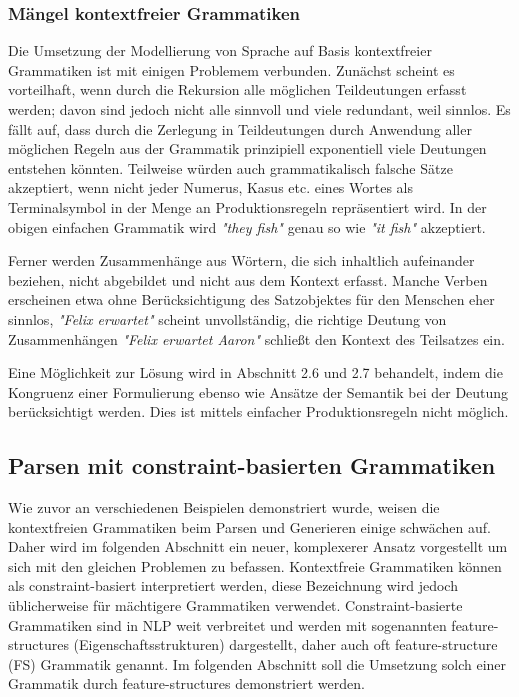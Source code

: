 \documentclass[12pt]{paper}
\begin{document}
\subsubsection{Mängel kontextfreier Grammatiken}
Die Umsetzung der Modellierung von Sprache auf Basis kontextfreier Grammatiken ist mit einigen Problemem verbunden. Zunächst scheint es vorteilhaft, wenn durch die Rekursion alle möglichen Teildeutungen erfasst werden; davon sind jedoch nicht alle sinnvoll und viele redundant, weil sinnlos. Es fällt auf, dass durch die Zerlegung in Teildeutungen durch Anwendung aller möglichen Regeln aus der Grammatik prinzipiell exponentiell viele Deutungen entstehen könnten. Teilweise würden auch grammatikalisch falsche Sätze akzeptiert, wenn nicht jeder Numerus, Kasus etc. eines Wortes als Terminalsymbol in der Menge an Produktionsregeln repräsentiert wird. In der obigen einfachen Grammatik wird \textit{"they fish"} genau so wie \textit{"it fish"} akzeptiert. 

Ferner werden Zusammenhänge aus Wörtern, die sich inhaltlich aufeinander beziehen, nicht abgebildet und nicht aus dem Kontext erfasst. Manche Verben erscheinen etwa ohne Berücksichtigung des Satzobjektes für den Menschen eher sinnlos, \textit{"Felix erwartet"} scheint unvollständig, die richtige Deutung von Zusammenhängen \textit{"Felix erwartet Aaron"} schließt den Kontext des Teilsatzes ein.

Eine Möglichkeit zur Lösung wird in Abschnitt 2.6 und 2.7 behandelt, indem die Kongruenz einer Formulierung ebenso wie Ansätze der Semantik bei der Deutung berücksichtigt werden. Dies ist mittels einfacher Produktionsregeln nicht möglich.

\subsection{Parsen mit constraint-basierten Grammatiken}
Wie zuvor an verschiedenen Beispielen demonstriert wurde, weisen die kontextfreien Grammatiken beim Parsen und Generieren einige schwächen auf. Daher wird im folgenden Abschnitt ein neuer, komplexerer Ansatz vorgestellt um sich mit den gleichen Problemen zu befassen. Kontextfreie Grammatiken können als constraint-basiert interpretiert werden, diese Bezeichnung wird jedoch üblicherweise für mächtigere Grammatiken verwendet. Constraint-basierte Grammatiken sind in NLP weit verbreitet und werden mit sogenannten feature-structures (Eigenschaftsstrukturen) dargestellt, daher auch oft feature-structure (FS) Grammatik genannt. Im folgenden Abschnitt soll die Umsetzung solch einer Grammatik durch feature-structures demonstriert werden.
\end{document}
